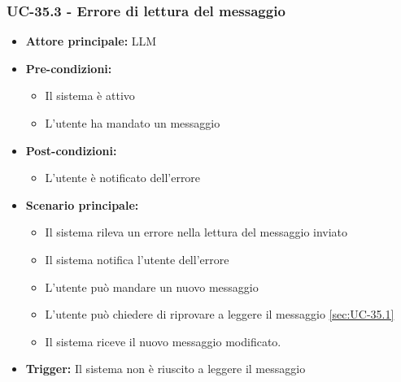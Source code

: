 \documentclass[a4paper,12pt]{article}
\begin{document}
\subsubsection{UC-35.3 - Errore di lettura del messaggio} \label{sec:UC-35.3}
\begin{itemize}
    \item \textbf{Attore principale:} LLM
    \item \textbf{Pre-condizioni:}
    \begin{itemize}
        \item Il sistema è attivo
	    \item L’utente ha mandato un messaggio
    \end{itemize}	
    \item \textbf{Post-condizioni:}
    \begin{itemize}
        \item L’utente è notificato dell'errore
    \end{itemize}
    \item \textbf{Scenario principale:} 
    \begin{itemize}
        \item Il sistema rileva un errore nella lettura del messaggio inviato
        \item Il sistema notifica l'utente dell'errore
        \item L'utente può mandare un nuovo messaggio
        \item L'utente può chiedere di riprovare a leggere il messaggio \ref{sec:UC-35.1}
	    \item Il sistema riceve il nuovo messaggio modificato.
    \end{itemize}
    \item \textbf{Trigger:} Il sistema non è riuscito a leggere il messaggio
\end{itemize}
\end{document}
